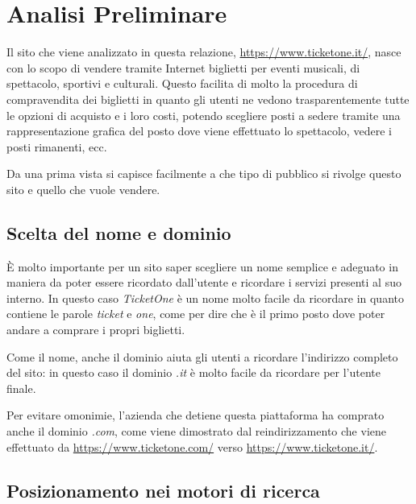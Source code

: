 \section{Analisi Preliminare}\label{analisipre}

Il sito che viene analizzato in questa relazione, \url{https://www.ticketone.it/}, nasce con lo scopo di vendere tramite Internet biglietti per eventi musicali, di spettacolo, sportivi e culturali.
Questo facilita di molto la procedura di compravendita dei biglietti in quanto gli utenti ne vedono trasparentemente tutte le opzioni di acquisto e i loro costi, potendo scegliere posti a sedere tramite una rappresentazione grafica del posto dove viene effettuato lo spettacolo, vedere i posti rimanenti, ecc.
\par Da una prima vista si capisce facilmente a che tipo di pubblico si rivolge questo sito e quello che vuole vendere.

\subsection{Scelta del nome e dominio}
	
	\`E molto importante per un sito saper scegliere un nome semplice e adeguato in maniera da poter essere ricordato dall'utente e ricordare i servizi presenti al suo interno.
	In questo caso \textit{TicketOne} è un nome molto facile da ricordare in quanto contiene le parole \textit{ticket} e \textit{one}, come per dire che è il primo posto dove poter andare a comprare i propri biglietti.
	\par Come il nome, anche il dominio aiuta gli utenti a ricordare l'indirizzo completo del sito: in questo caso il dominio \textit{.it} è molto facile da ricordare per l'utente finale.
	\par Per evitare omonimie, l'azienda che detiene questa piattaforma ha comprato anche il dominio \textit{.com}, come viene dimostrato dal reindirizzamento che viene effettuato da \url{https://www.ticketone.com/} verso \url{https://www.ticketone.it/}.

\subsection{Posizionamento nei motori di ricerca}

